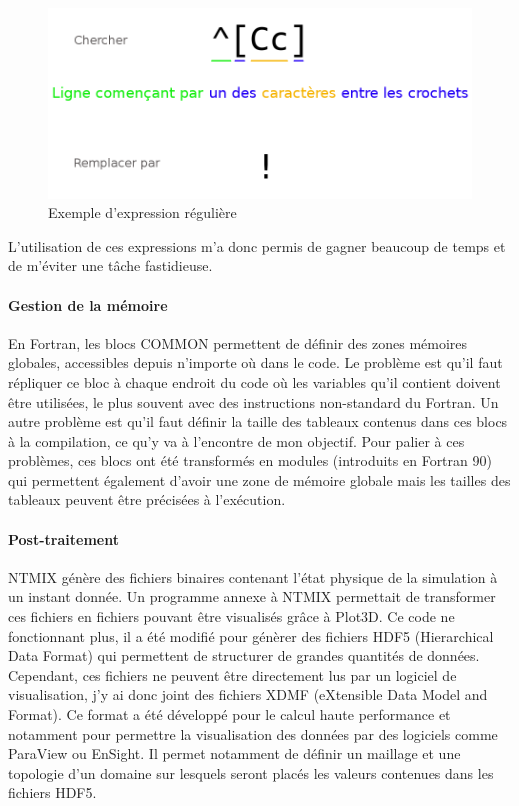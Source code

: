 \begin{figure}[ht]
  \centering
  \includegraphics[scale=0.3]{figures/regex.png}
  \caption{\label{fig:regex}Exemple d'expression régulière}
\end{figure}


L'utilisation de ces expressions m'a donc permis de gagner beaucoup de temps et de m'éviter une tâche fastidieuse.

\paragraph{Gestion de la mémoire}En Fortran, les blocs COMMON permettent de définir des zones mémoires globales, accessibles depuis n'importe où dans le code. Le problème est qu'il faut répliquer ce bloc à chaque endroit du code où les variables qu'il contient doivent être utilisées, le plus souvent avec des instructions non-standard du Fortran. Un autre problème est qu'il faut définir la taille des tableaux contenus dans ces blocs à la compilation, ce qu'y va à l'encontre de mon objectif. Pour palier à ces problèmes, ces blocs ont été transformés en modules (introduits en Fortran 90) qui permettent également d'avoir une zone de mémoire globale mais les tailles des tableaux peuvent être précisées à l'exécution.

\paragraph{Post-traitement}NTMIX génère des fichiers binaires contenant l'état physique de la simulation à un instant donnée. Un programme annexe à NTMIX permettait de transformer ces fichiers en fichiers pouvant être visualisés grâce à Plot3D. Ce code ne fonctionnant plus, il a été modifié pour génèrer des fichiers HDF5 (Hierarchical Data Format) qui permettent de structurer de grandes quantités de données. Cependant, ces fichiers ne peuvent être directement lus par un logiciel de visualisation, j'y ai donc joint des fichiers XDMF (eXtensible Data Model and Format). Ce format a été développé pour le calcul haute performance et notamment pour permettre la visualisation des données par des logiciels comme ParaView ou EnSight. Il permet notamment de définir un maillage et une topologie d'un domaine sur lesquels seront placés les valeurs contenues dans les fichiers HDF5.


